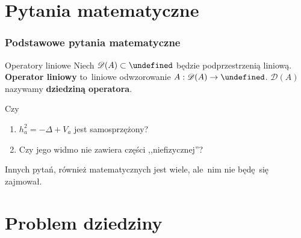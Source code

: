 \documentclass{beamer} \mode<presentation>
\newcommand{\tb}{\textbf}
\newcommand{\mc}{\mathcal}
\newcommand{\ra}{\rightarrow}
\newcommand{\Del}{\Delta}
\newcommand{\D}{\mc{D}}
\let\H\undefined
\newcommand{\H}{\mc{H}}
\newcommand{\sset}{\subset}
\begin{document}
\section{Pytania matematyczne}



\begin{frame}
  \frametitle{Podstawowe pytania matematyczne}

  \begin{block}{Operatory liniowe}
    Niech $\D( A ) \sset \H$ będzie podprzestrzenią liniową.
    \tb{Operator liniowy} to~liniowe odwzorowanie $A: \D( A ) \ra \H$.
    $\D( A )$ nazywamy \tb{dziedziną operatora}.
  \end{block}

  \begin{block}{Czy}
    \begin{enumerate}
    \item $h_{ a }^{ 2 } = -\Del + V_{ a }$ jest samosprzężony?
    \item Czy jego widmo nie zawiera części ,,niefizycznej''?
    \end{enumerate}
    Innych pytań, również matematycznych jest wiele, ale~nim nie
    będę~się zajmował.
  \end{block}

\end{frame}



\section{Problem dziedziny}
\end{document}

